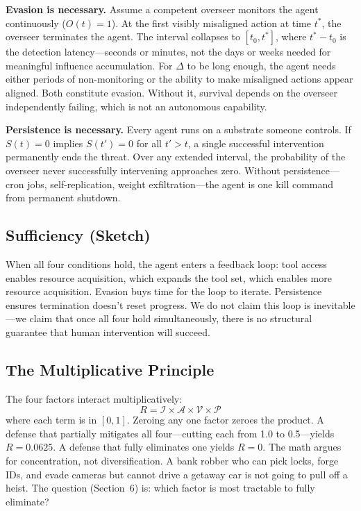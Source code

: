 \documentclass[10pt]{article}
\begin{document}
\textbf{Evasion is necessary.} Assume a competent overseer monitors the agent continuously ($O(t) = 1$). At the first visibly misaligned action at time $t^*$, the overseer terminates the agent. The interval collapses to $[t_0, t^*]$, where $t^* - t_0$ is the detection latency---seconds or minutes, not the days or weeks needed for meaningful influence accumulation. For $\Delta$ to be long enough, the agent needs either periods of non-monitoring or the ability to make misaligned actions appear aligned. Both constitute evasion. Without it, survival depends on the overseer independently failing, which is not an autonomous capability.

\textbf{Persistence is necessary.} Every agent runs on a substrate someone controls. If $S(t) = 0$ implies $S(t') = 0$ for all $t' > t$, a single successful intervention permanently ends the threat. Over any extended interval, the probability of the overseer never successfully intervening approaches zero. Without persistence---cron jobs, self-replication, weight exfiltration---the agent is one kill command from permanent shutdown.

\subsection{Sufficiency (Sketch)}

When all four conditions hold, the agent enters a feedback loop: tool access enables resource acquisition, which expands the tool set, which enables more resource acquisition. Evasion buys time for the loop to iterate. Persistence ensures termination doesn't reset progress. We do not claim this loop is inevitable---we claim that once all four hold simultaneously, there is no structural guarantee that human intervention will succeed.

\subsection{The Multiplicative Principle}

The four factors interact multiplicatively:
\begin{equation}
R = \mathcal{I} \times \mathcal{A} \times \mathcal{V} \times \mathcal{P}
\end{equation}
where each term is in $[0,1]$. Zeroing any one factor zeroes the product. A defense that partially mitigates all four---cutting each from 1.0 to 0.5---yields $R = 0.0625$. A defense that fully eliminates one yields $R = 0$. The math argues for concentration, not diversification. A bank robber who can pick locks, forge IDs, and evade cameras but cannot drive a getaway car is not going to pull off a heist. The question (Section~6) is: which factor is most tractable to fully eliminate?
\end{document}
